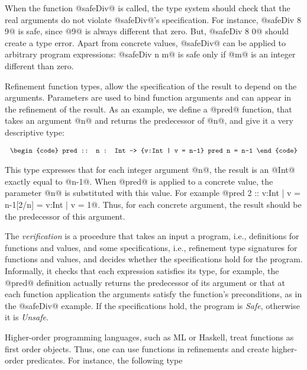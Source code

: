 When the function @safeDiv@ is called, 
the type system should check that the real arguments do not
violate @safeDiv@'s specification.
%
For instance, 
@safeDiv 8 9@ is safe, since @9@ is always different that zero.
But, @safeDiv 8 0@ should create a type error.
Apart from concrete values, @safeDiv@ can be applied to arbitrary program expressions:
@safeDiv n m@ is safe only if 
@m@ is an integer different than zero.

Refinement function types, allow the specification of the 
result to depend on the arguments.
%
Parameters are used to bind function arguments
and can appear in the refinement of the result.
%
As an example, we define a @pred@ function, 
that takes an argument @n@ and returns the predecessor of @n@,
and give it a very descriptive type:

$$\centering\begin{tabular}{c}\begin{code}
pred :: n : Int -> {v:Int | v = n-1}
pred n = n-1
\end{code}\end{tabular}$$

This type expresses that for each integer argument @n@, 
the result is an @Int@ exactly equal to @n-1@.
When @pred@ is applied to a concrete value, 
the parameter @n@ is substituted with this value.
For example @pred 2 :: {v:Int | v = n-1}[2/n] = {v:Int | v = 1}@.
Thus, for each concrete argument, the result should be the predecessor 
of this argument.

The \textit{verification} is a procedure that takes an input 
a program, i.e.,  definitions for functions and values,
and some specifications, i.e., refinement type signatures for functions and values,
and decides whether the specifications hold for the program.
%
Informally, it checks that 
each expression satisfies its type, 
for example, the @pred@ definition actually returns the 
predecessor of its argument
or that 
at each function application the arguments satisfy
the function's preconditions, 
as in the @safeDiv@ example.
%
If the specifications hold, the program is \textit{Safe}, 
otherwise it is \textit{Unsafe}. 

Higher-order programming languages, such as ML or Haskell, 
treat functions as first order objects.
Thus, one can use functions in refinements and 
create higher-order predicates. 
For instance, the following type

